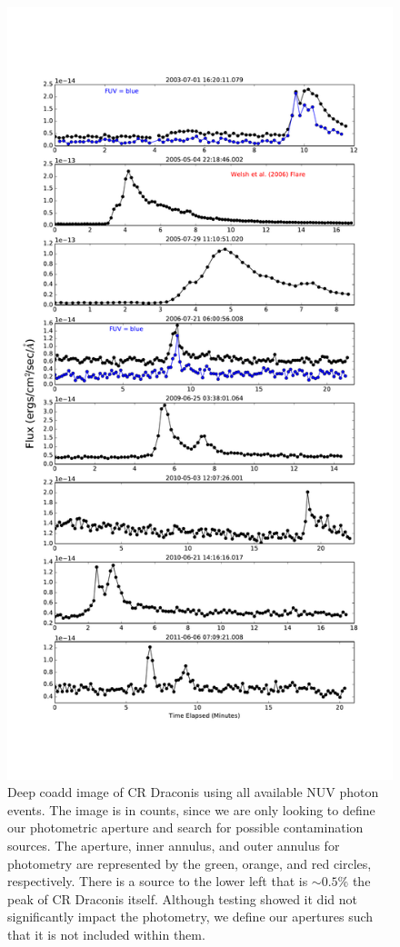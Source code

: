 \documentclass[preprint]{aastex}
\begin{document}
\clearpage
\begin{figure}[h]
\includegraphics[scale=0.375]{Fig13.pdf}
\caption{Deep coadd image of CR Draconis using all available NUV photon events. The image is in counts, since we are only looking to define our photometric aperture and search for possible contamination sources. The aperture, inner annulus, and outer annulus for photometry are represented by the green, orange, and red circles, respectively.  There is a source to the lower left that is $\sim 0.5$\% the peak of CR Draconis itself. Although testing showed it did not significantly impact the photometry, we define our apertures such that it is not included within them.\label{crdracoadd}}
\end{figure}
\clearpage
\end{document}
